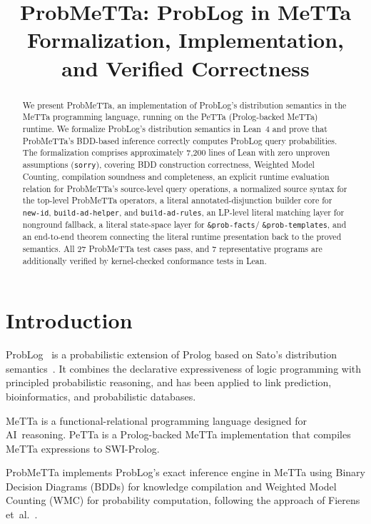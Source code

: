 \documentclass[11pt,a4paper]{article}
\title{ProbMeTTa: ProbLog in MeTTa\\[0.3em]
\large Formalization, Implementation, and Verified Correctness}
\author{}
\date{}
\theoremstyle{definition}
\begin{document}
\maketitle

\begin{abstract}
We present ProbMeTTa, an implementation of ProbLog's distribution semantics
in the MeTTa programming language, running on the PeTTa (Prolog-backed MeTTa)
runtime. We formalize ProbLog's distribution semantics in Lean~4 and prove
that ProbMeTTa's BDD-based inference correctly computes ProbLog query
probabilities. The formalization comprises approximately 7{,}200 lines of
Lean with zero unproven assumptions (\texttt{sorry}), covering BDD
construction correctness, Weighted Model Counting, compilation
soundness and completeness, an explicit runtime evaluation relation
for ProbMeTTa's source-level query operations, a normalized source syntax
for the top-level ProbMeTTa operators, a literal annotated-disjunction
builder core for \texttt{new-id}, \texttt{build-ad-helper}, and
\texttt{build-ad-rules}, an LP-level literal matching layer for nonground
fallback, a literal state-space layer for \texttt{\&prob-facts}/
\texttt{\&prob-templates}, and an end-to-end theorem connecting the literal
runtime presentation back to the proved semantics. All 27 ProbMeTTa test cases
pass, and 7
representative programs are additionally verified by kernel-checked
conformance tests in Lean.
\end{abstract}

\section{Introduction}

ProbLog~\cite{deraedt2007} is a probabilistic extension of Prolog based on
Sato's distribution semantics~\cite{sato1995}. It combines the declarative
expressiveness of logic programming with principled probabilistic reasoning,
and has been applied to link prediction, bioinformatics, and probabilistic
databases.

MeTTa is a functional-relational programming language designed for
AI~reasoning. PeTTa is a Prolog-backed MeTTa implementation that
compiles MeTTa expressions to SWI-Prolog.

ProbMeTTa implements ProbLog's exact inference engine in MeTTa using Binary
Decision Diagrams (BDDs) for knowledge compilation and Weighted Model
Counting (WMC) for probability computation, following the approach of
Fierens et~al.~\cite{fierens2015}.
\end{document}
